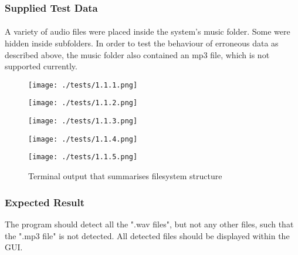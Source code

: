 \paragraph{}
{
	\centering
}

\subsubsection{Supplied Test Data}
\paragraph{}
A variety of audio files were placed inside the system's music folder. Some were hidden inside subfolders. In order to test the behaviour of erroneous data as described above, the music folder also contained an mp3 file, which is not supported currently.

\begin{figure}[H]
	\texttt{[image: ./tests/1.1.1.png]}
\end{figure}
\begin{figure}[H]
	\texttt{[image: ./tests/1.1.2.png]}
\end{figure}
\begin{figure}[H]
	\texttt{[image: ./tests/1.1.3.png]}
\end{figure}
\begin{figure}[H]
	\texttt{[image: ./tests/1.1.4.png]}
\end{figure}
\begin{figure}[H]
	\texttt{[image: ./tests/1.1.5.png]}
	\caption{Terminal output that summarises filesystem structure}
\end{figure}

\subsubsection{Expected Result}
The program should detect all the ".wav files", but not any other files, such that the ".mp3 file" is not detected. All detected files should be displayed within the GUI.

